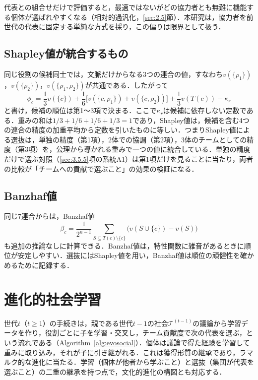 代表との組合せだけで評価すると，最適ではないがどの協力者とも無難に機能する個体が選ばれやすくなる（相対的過汎化，\ref{sec:2.5}節）．本研究は，協力者を前世代の代表に固定する単純な方式を採り，この偏りは限界として扱う．

\subsection{Shapley値が統合するもの}
\label{sec:3.4.2}

同じ役割の候補同士では，文脈だけからなる3つの連合の値，すなわち$v(\{\rho_1\})$，$v(\{\rho_2\})$，$v(\{\rho_1,\rho_2\})$が共通である．したがって
\begin{equation}
\phi_c = \frac{1}{3} v(\{c\}) + \frac{1}{6} \Big[ v(\{c,\rho_1\}) + v(\{c,\rho_2\}) \Big] + \frac{1}{3} v(T(c)) - \kappa_r
\label{eq:shapleyrank}
\end{equation}
と書け，候補の順位は第1〜3項で決まる．ここで$\kappa_r$は候補に依存しない定数である．重みの和は$1/3 + 1/6 + 1/6 + 1/3 = 1$であり，Shapley値は，候補を含む4つの連合の精度の加重平均から定数を引いたものに等しい．つまりShapley値による選抜は，単独の精度（第1項），2体での協調（第2項），3体のチームとしての精度（第3項）を，公理から導かれる重みで一つの値に統合している．単独の精度だけで選ぶ対照（\ref{sec:3.5.5}項の系統A1）は第1項だけを見ることに当たり，両者の比較が「チームへの貢献で選ぶこと」の効果の検証になる．

\subsection{Banzhaf値}
\label{sec:3.4.3}

同じ7連合からは，Banzhaf値\cite{banzhaf1965weighted}
\begin{equation}
\beta_c = \frac{1}{2^{n-1}} \sum_{S \subseteq T(c) \setminus \{c\}} \Big( v(S \cup \{c\}) - v(S) \Big)
\label{eq:banzhaf}
\end{equation}
も追加の推論なしに計算できる．Banzhaf値は，特性関数に雑音があるときに順位が安定しやすい\cite{wang2023databanzhaf}．選抜にはShapley値を用い，Banzhaf値は順位の頑健性を確かめるために記録する．

\section{進化的社会学習}
\label{sec:3.5}

世代$t$（$t \geq 1$）の手続きは，親である世代$t-1$の社会$\mathcal{T}^{(t-1)}$の議論から学習データを作り，役割ごとに子を学習・交叉し，チーム貢献度で次の代表を選ぶ，という流れである（Algorithm~\ref{alg:evosocial}）．個体は議論で得た経験を学習して重みに取り込み，それが子に引き継がれる．これは獲得形質の継承であり，ラマルク的な進化\cite{whitley1994lamarckian}に当たる．学習（個体が他者から学ぶこと）と選抜（集団が代表を選ぶこと）の二重の継承を持つ点で，文化的進化\cite{boyd1985culture}の構図とも対応する．

